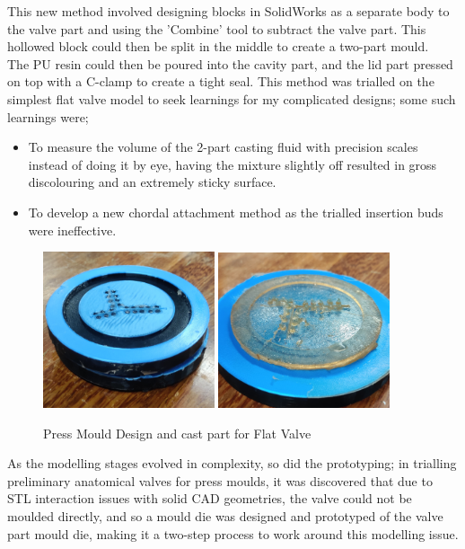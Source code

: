 This new method involved designing blocks in SolidWorks as a separate body to the valve part and using the 'Combine' tool to subtract the valve part. This hollowed block could then be split in the middle to create a two-part mould.\\
The \gls{PU} resin could then be poured into the cavity part, and the lid part pressed on top with a C-clamp to create a tight seal.
\mynewline
This method was trialled on the simplest flat valve model to seek learnings for my complicated designs; some such learnings were;
\begin{itemize}
    \item To measure the volume of the 2-part casting fluid with precision scales instead of doing it by eye, having the mixture slightly off resulted in gross discolouring and an extremely sticky surface.
    \item To develop a new chordal attachment method as the trialled insertion buds were ineffective.
\end{itemize}
\begin{figure}
    \centering
    \includegraphics[width=0.45\textwidth]{figures/flat mould}
    \includegraphics[width=0.45\textwidth]{figures/flat valve}
    \caption{Press Mould Design and cast part for Flat Valve}
    \label{fig:flat mould}
\end{figure}

\mynewline
As the modelling stages evolved in complexity, so did the prototyping; in trialling preliminary anatomical valves for press moulds, it was discovered that due to STL interaction issues with solid \gls{CAD} geometries, the valve could not be moulded directly, and so a mould die was designed and prototyped of the valve part mould die, making it a two-step process to work around this modelling issue.

